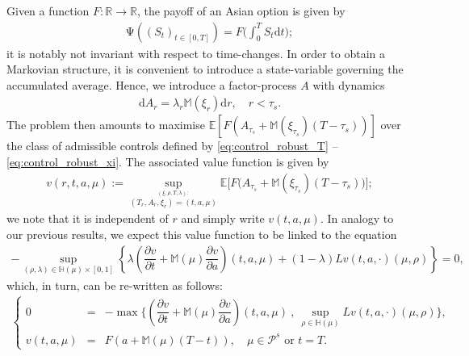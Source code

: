 \documentclass{article}
\theoremstyle{definition}
\numberwithin{equation}{section}
\numberwithin{theorem}{section}
\newcommand{\E}{\mathbb{E}}
\newcommand{\di}{\mathrm{d}}
\newcommand{\pian}[2]{\dfrac{\partial #1}{\partial #2}}
\newcommand{\piann}[2]{\dfrac{\partial^{2}#1}{\partial #2^{2}}}
\newcommand{\R}{\mathbb{R}}
\newcommand{\dx}{\mathrm{d}x}
\newcommand{\dy}{\mathrm{d}y}
\newcommand{\dt}{\mathrm{d}t}
\newcommand{\Hb}{\mathbb{H}}
\newcommand{\Mb}{\mathbb{M}}
\newcommand{\Pc}{\mathcal{P}}
\begin{document}
	Given a function $F:\R\to\R$, the payoff of an Asian option is given by
     \begin{align*}
		\mathrm{\Psi}\left((S_t)_{t\in[0,T]}\right)=F\bigg(\int_0^TS_t\dt\bigg);
     \end{align*}
     it is notably not invariant with respect to time-changes. 
     In order to obtain a Markovian structure, it is convenient to introduce a state-variable governing the accumulated average. Hence, we introduce a factor-process $A$ with dynamics 
	\begin{align*}
		\di A_r=\lambda_r\Mb(\xi_r)\di r,
		\quad r<\tau_s.
	\end{align*}
	The problem then amounts to maximise $\E[F(A_{\tau_s}+\Mb(\xi_{\tau_s})(T-\tau_s))]$
	over the class of admissible controls defined by \eqref{eq:control_robust_T} -- \eqref{eq:control_robust_xi}.
	The associated value function is given by
	\begin{align*}
		v(r,t,a,\mu):=\sup_{\stackrel{(\xi,\rho,T,\lambda):}{(T_r,A_r,\xi_r)=(t,a,\mu)}}
		\E\big[F\big(A_{\tau_s}+\Mb(\xi_{\tau_s})(T-\tau_s)\big)\big];
	\end{align*}
	we note that it is independent of $r$ and simply write $v(t,a,\mu)$. 
	In analogy to our previous results, we expect this value function to be linked to the equation 
	\begin{align*}
	-\sup_{(\rho,\lambda)\in\Hb(\mu)\times[0,1]}
	\left\{\lambda\left(\pian{v}{t}+\mathbb{M}(\mu)\pian{v}{a}\right)(t,a,\mu)
      +(1-\lambda)Lv(t,a,\cdot)(\mu,\rho)\right\}
      =0,
	\end{align*} 
      which, in turn, can be re-written as follows:
     	\begin{align}\label{eq:hjb_asian}
     	\left\{\begin{array}{rcl}
          		0 &=& -\max\bigg\{\left(\pian{v}{t}+\mathbb{M}(\mu)\pian{v}{a}\right)(t,a,\mu)~,~
          		\sup\limits_{\rho\in\Hb(\mu)}Lv(t,a,\cdot)(\mu,\rho)
          		\bigg\},\\ %
          		v(t,a,\mu) &=& F\left(a+\Mb(\mu)(T-t)\right),\quad\textrm{$\mu\in\Pc^s$ or $t=T$}.
		\end{array}
		\right.
		\end{align}		
	
\end{document}
